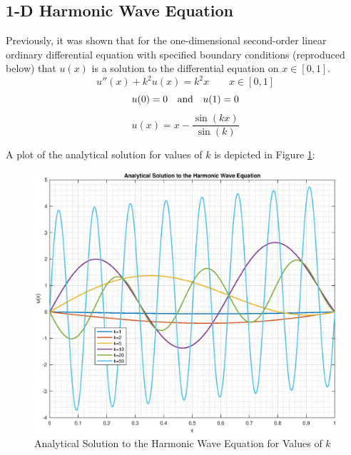\documentclass[10pt]{article}		%
\numberwithin{equation}{section}
\begin{document}
\newpage

\subsection{1-D Harmonic Wave Equation}

Previously, it was shown that for the one-dimensional second-order linear ordinary differential equation with specified boundary conditions (reproduced below) that $u(x)$ is a solution to the differential equation on $x \in [0, 1]$.
\begin{equation}
u''(x)+k^2u(x)=k^2x \qquad x \in [0, 1]
\end{equation}
\begin{equation}
u(0) = 0 \quad \textnormal{and} \quad u(1) = 0 
\end{equation}
\begin{equation}
u(x) = x - \frac{\sin(kx)}{\sin(k)}
\end{equation}

A plot of the analytical solution for values of $k$ is depicted in Figure \ref{fig:analytical_harmonic}:
\begin{figure}[H]
	\begin{center}
		\includegraphics[width = 0.95\linewidth]{analytical_solution_harmonic_wave}
		\caption{Analytical Solution to the Harmonic Wave Equation for Values of $k$}
		\label{fig:analytical_harmonic}
	\end{center}
\end{figure}

\newpage
\end{document}
